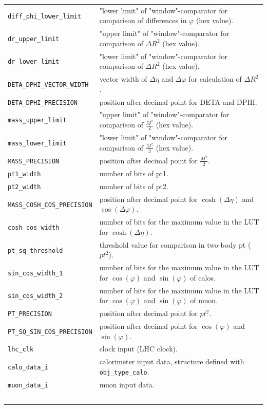 \begin{longtable}{>{\footnotesize}l >{\footnotesize}p{}}
\verb|diff_phi_lower_limit| & "lower limit" of "window"-comparator for comparison of differences in $\varphi$ (hex value).\\
\verb|dr_upper_limit| & "upper limit" of "window"-comparator for comparison of $\Delta$$R^2$ (hex value).\\
\verb|dr_lower_limit| & "lower limit" of "window"-comparator for comparison of $\Delta$$R^2$ (hex value).\\
\verb|DETA_DPHI_VECTOR_WIDTH| & vector width of $\Delta\eta$ and $\Delta\varphi$ for calculation of $\Delta$$R^2$.\\
\verb|DETA_DPHI_PRECISION| & position after decimal point for DETA and DPHI.\\
\verb|mass_upper_limit| & "upper limit" of "window"-comparator for comparison of $\frac{M^2}{2}$ (hex value).\\
\verb|mass_lower_limit| & "lower limit" of "window"-comparator for comparison of $\frac{M^2}{2}$ (hex value).\\
\verb|MASS_PRECISION| & position after decimal point for $\frac{M^2}{2}$.\\
\verb|pt1_width| & number of bits of pt1.\\
\verb|pt2_width| & number of bits of pt2.\\
\verb|MASS_COSH_COS_PRECISION| & position after decimal point for $\cosh(\Delta\eta)$ and $\cos(\Delta\varphi)$.\\
\verb|cosh_cos_width| & number of bits for the maximum value in the LUT for $\cosh(\Delta\eta)$.\\
\verb|pt_sq_threshold| & threshold value for comparison in two-body pt (${pt^2}$).\\
\verb|sin_cos_width_1| & number of bits for the maximum value in the LUT for $\cos(\varphi)$ and $\sin(\varphi)$ of calos.\\
\verb|sin_cos_width_2| & number of bits for the maximum value in the LUT for $\cos(\varphi)$ and $\sin(\varphi)$ of muon.\\
\verb|PT_PRECISION| & position after decimal point for ${pt^2}$.\\
\verb|PT_SQ_SIN_COS_PRECISION| & position after decimal point for $\cos(\varphi)$ and $\sin(\varphi)$.\\
\verb|lhc_clk| & clock input (LHC clock).\\
\verb|calo_data_i| & calorimeter input data, structure defined with \texttt{obj\_type\_calo}.\\
\verb|muon_data_i| & muon input data.\\
$$
\end{longtable}
